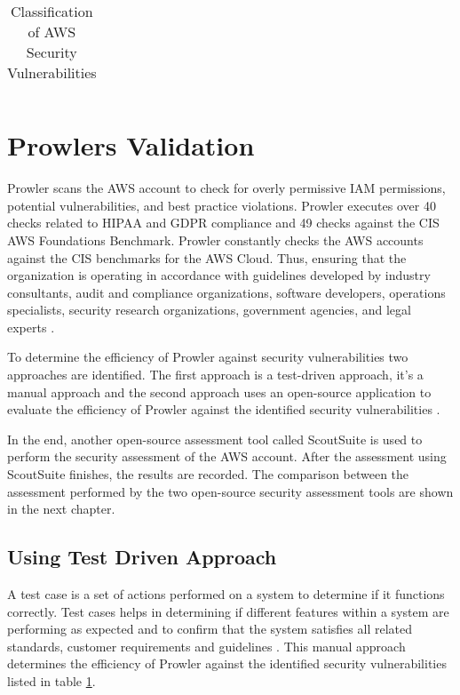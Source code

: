 \begin{longtable}{|p{12cm}|p{2.4cm}|}
    \caption{Classification of AWS Security Vulnerabilities}
    \label{tab:classificationofsecurityvulnerabilities}
\end{longtable}

\section{Prowlers Validation}

\par Prowler scans the AWS account to check for overly permissive IAM permissions, potential vulnerabilities, and best practice violations.
Prowler executes over 40 checks related to HIPAA and GDPR compliance and 49 checks against the CIS AWS Foundations Benchmark.
Prowler constantly checks the AWS accounts against the
CIS benchmarks for the AWS Cloud. Thus, ensuring that the
organization is operating in accordance with guidelines developed by industry consultants, audit and compliance organizations, software developers, operations specialists, security research organizations, government agencies, and legal experts \cite{74}.

\par To determine the efficiency of Prowler against security vulnerabilities two approaches are identified.
The first approach is a test-driven approach, it’s a
manual approach and the second approach uses an open-source application to evaluate the efficiency of Prowler against the identified security vulnerabilities \cite{47}.

\par In the end, another open-source assessment tool called ScoutSuite is used to perform the security assessment of the AWS account.
After the assessment using ScoutSuite finishes, the results are recorded.
The comparison between the assessment performed by the two open-source security
assessment tools are shown in the next chapter.

\subsection{Using Test Driven Approach}

\par A test case is a set of actions performed on a system to determine if it functions correctly. Test cases helps
in determining if different features within a system are performing as expected and to confirm that the system
satisfies all related standards, customer requirements and guidelines \cite{75}. This manual approach determines the
efficiency of Prowler against the identified security vulnerabilities listed in table \ref{tab:classificationofsecurityvulnerabilities}.

